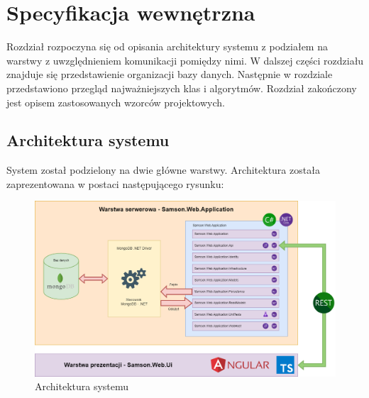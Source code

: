 \documentclass[a4paper,twoside,12pt]{book}
\begin{document}
\chapter{Specyfikacja wewnętrzna}
Rozdział rozpoczyna się od opisania architektury systemu z podziałem na warstwy z uwzględnieniem komunikacji pomiędzy nimi. W dalszej części rozdziału znajduje się przedstawienie organizacji bazy danych. Następnie w rozdziale przedstawiono przegląd najważniejszych klas i algorytmów. Rozdział zakończony jest opisem zastosowanych wzorców projektowych.

\section{Architektura systemu}
System został podzielony na dwie główne warstwy. Architektura została zaprezentowana w postaci następującego rysunku:
\begin{figure}[H]
	\centering
	\includegraphics[width=1\linewidth]{../diagramy/architektura}
	\caption{Architektura systemu}
	\label{fig:architektura}
\end{figure}
\end{document}
